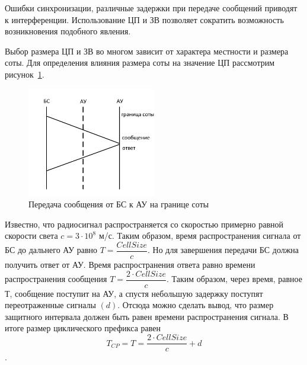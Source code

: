 Ошибки синхронизации, различные задержки при передаче сообщений приводят к интерференции.
Использование ЦП и ЗВ позволяет сократить возможность возникновения подобного явления.

Выбор размера ЦП и ЗВ во многом зависит от характера местности и размера соты. Для определения
влияния размера соты на значение ЦП рассмотрим рисунок~\ref{fig:vol_calc_CP}.
\begin{figure}[H]
    \centering
    \includegraphics[width=0.5\textwidth]{img/vol_calc_CP}
    \caption{Передача сообщения от БС к АУ на границе соты}
    \label{fig:vol_calc_CP}
\end{figure}

Известно, что радиосигнал распространяется со скоростью примерно равной скорости света \(c = 3 \cdot
10^{8}\) м/с. Таким образом, время распространения сигнала от БС до дальнего АУ равно
\(T = \dfrac{Cell Size}{c}\). Но для завершения передачи БС должна получить ответ от АУ.
Время распространения ответа равно времени распространения сообщения \(T = \dfrac{2 \cdot Cell
Size}{c}\). Таким образом, через время, равное \(Т\), сообщение поступит на АУ, а спустя небольшую
задержку поступят переотраженные сигналы \((d)\).
Отсюда можно сделать вывод, что размер защитного интервала должен быть равен времени распространения
сигнала. В итоге размер циклического префикса равен \[T_{CP} = T = \dfrac{2 \cdot Cell Size}{c} + d\].

